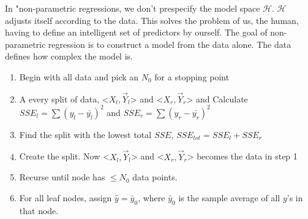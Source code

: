 \documentclass[12pt]{article}
\newcommand{\calH}{\mathcal{H}}
\begin{document}
\begin{enumerate}

In "non-parametric regressions, we don't prespecify the model space $\calH$. $\calH$ adjusts itself according to the data. This solves the problem of us, the human, having to define an intelligent set of predictors by ourself. The goal of non-parametric regression is to construct a model from the data alone. The data defines how complex the model is.


\begin{enumerate}
\item Begin with all data and pick an $N_0$ for a stopping point
\item A every split of data,  <$X_l, \vec{Y}_l$> and <$X_r, \vec{Y}_r$> and Calculate $SSE_l=\sum(y_l-\bar{y_l})^2$ and $SSE_r=\sum(y_r-\bar{y_r})^2$
\item Find the  split with the lowest total $SSE$, $SSE_{tot}=SSE_{l}+SSE_{r}$
\item Create the split. Now <$X_l, \vec{Y}_l$> and <$X_r, \vec{Y}_r$> becomes the data in step 1
\item Recurse until node has $\leq N_0$ data points.  
\item For all leaf nodes, assign $\hat{y}=\bar{y}_0$, where $\bar{y}_0$ is the sample average of all $y$'s in that node.
\end{enumerate}

\end{enumerate}
\end{document}
